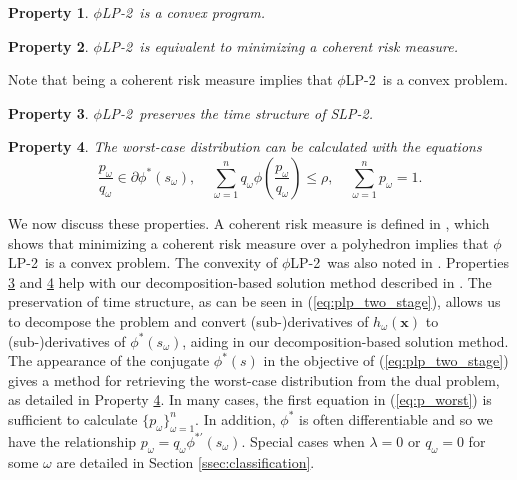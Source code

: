 \documentclass[opre,nonblindrev]{informs3} %
\newcommand{\x}{\mathbf{x}}
\newtheorem{property}{Property}
\newcommand{\plp}{$\phi$LP-2}
\begin{document}
\begin{property}
	\label{property:convex}
	\plp\ is a convex program.
\end{property}

\begin{property}
	\label{property:coherent_risk_measure}
	\plp\ is equivalent to minimizing a coherent risk measure.
\end{property}

Note that being a coherent risk measure implies that \plp\ is a convex problem.

\begin{property}
	\label{property:time_structure}
	\plp\ preserves the time structure of SLP-2.
\end{property}

\begin{property}
	\label{property:primal_dual_relation}
	The worst-case distribution can be calculated with the equations
	\begin{equation}\label{eq:p_worst}
		\frac{p_\omega}{q_\omega} \in \partial \phi^*\left(s_\omega\right), \ \ \ \ \ \sum_{\omega=1}^n q_\omega \phi\left(\frac{p_\omega}{q_\omega}\right) \leq \rho, \ \ \ \ \ \sum_{\omega=1}^n p_\omega = 1.
	\end{equation}
\end{property}

We now discuss these properties. A coherent risk measure is defined in \citep{rockafellar2007coherent}, which shows that minimizing a coherent risk measure over a polyhedron implies that \plp\ is a convex problem.
The convexity of \plp\ was also noted in \citep{bental2011robust}.
Properties \ref{property:time_structure} and \ref{property:primal_dual_relation} help with our decomposition-based solution method described in \cite{love2013phi}.
The preservation of time structure, as can be seen in (\ref{eq:plp_two_stage}), allows us to decompose the problem and convert (sub-)derivatives of $h_\omega(\x)$ to (sub-)derivatives of $\phi^*\left(s_\omega\right)$, aiding in our decomposition-based solution method. 
The appearance of the conjugate $\phi^*(s)$ in the objective of (\ref{eq:plp_two_stage}) gives a method for retrieving the worst-case distribution from the dual problem, as detailed in Property \ref{property:primal_dual_relation}.
In many cases, the first equation in (\ref{eq:p_worst}) is sufficient to calculate $\{p_\omega\}_{\omega=1}^n$.
In addition, $\phi^*$ is often differentiable and so we have the relationship $p_\omega = q_\omega \phi^{* \prime}(s_\omega)$.
Special cases when $\lambda = 0$ or $q_\omega = 0$ for some $\omega$ are detailed in Section \ref{ssec:classification}.
\end{document}
